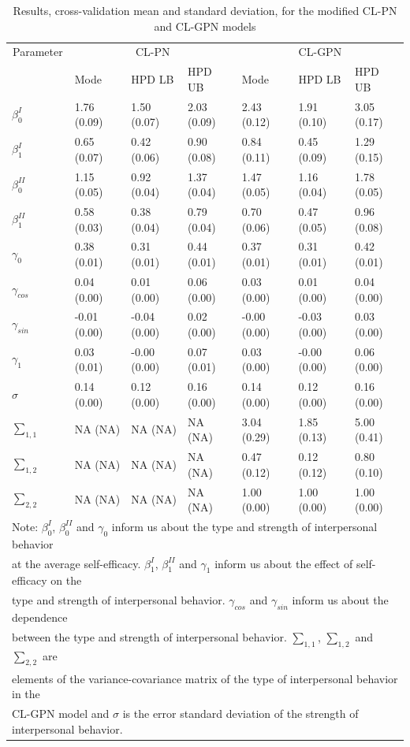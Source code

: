 \documentclass[man,mask]{apa6}
\begin{document}
\begin{table}

\caption{\label{tab:estCLGPN}Results, cross-validation mean and standard deviation, for the modified CL-PN and CL-GPN models}
\centering
\begin{tabular}[t]{lllllll}
\toprule
\multicolumn{1}{c}{Parameter} & \multicolumn{3}{c}{CL-PN} & \multicolumn{3}{c}{CL-GPN} \\
\cmidrule(l{2pt}r{2pt}){1-1} \cmidrule(l{2pt}r{2pt}){2-4} \cmidrule(l{2pt}r{2pt}){5-7}
  & Mode & HPD LB & HPD UB & Mode & HPD LB & HPD UB\\
\midrule
$\beta_0^{I}$ & 1.76 (0.09) & 1.50 (0.07) & 2.03 (0.09) & 2.43 (0.12) & 1.91 (0.10) & 3.05 (0.17)\\
$\beta_1^{I}$ & 0.65 (0.07) & 0.42 (0.06) & 0.90 (0.08) & 0.84 (0.11) & 0.45 (0.09) & 1.29 (0.15)\\
$\beta_0^{II}$ & 1.15 (0.05) & 0.92 (0.04) & 1.37 (0.04) & 1.47 (0.05) & 1.16 (0.04) & 1.78 (0.05)\\
$\beta_1^{II}$ & 0.58 (0.03) & 0.38 (0.04) & 0.79 (0.04) & 0.70 (0.06) & 0.47 (0.05) & 0.96 (0.08)\\
$\gamma_0$ & 0.38 (0.01) & 0.31 (0.01) & 0.44 (0.01) & 0.37 (0.01) & 0.31 (0.01) & 0.42 (0.01)\\
\addlinespace
$\gamma_{cos}$ & 0.04 (0.00) & 0.01 (0.00) & 0.06 (0.00) & 0.03 (0.00) & 0.01 (0.00) & 0.04 (0.00)\\
$\gamma_{sin}$ & -0.01 (0.00) & -0.04 (0.00) & 0.02 (0.00) & -0.00 (0.00) & -0.03 (0.00) & 0.03 (0.00)\\
$\gamma_1$ & 0.03 (0.01) & -0.00 (0.00) & 0.07 (0.01) & 0.03 (0.00) & -0.00 (0.00) & 0.06 (0.00)\\
$\sigma$ & 0.14 (0.00) & 0.12 (0.00) & 0.16 (0.00) & 0.14 (0.00) & 0.12 (0.00) & 0.16 (0.00)\\
$\sum_{1,1}$ & NA (NA) & NA (NA) & NA (NA) & 3.04 (0.29) & 1.85 (0.13) & 5.00 (0.41)\\
\addlinespace
$\sum_{1,2}$ & NA (NA) & NA (NA) & NA (NA) & 0.47 (0.12) & 0.12 (0.12) & 0.80 (0.10)\\
$\sum_{2,2}$ & NA (NA) & NA (NA) & NA (NA) & 1.00 (0.00) & 1.00 (0.00) & 1.00 (0.00)\\
\bottomrule
\multicolumn{7}{l}{Note: $\beta_0^{I}$, $\beta_0^{II}$ and $\gamma_0$ inform us about the type and strength of interpersonal behavior}\\
\multicolumn{7}{l}{at the average self-efficacy. $\beta_1^{I}$, $\beta_1^{II}$ and $\gamma_1$ inform us about the effect of self-efficacy on the}\\
\multicolumn{7}{l}{type and strength of interpersonal behavior. $\gamma_{cos}$ and $\gamma_{sin}$ inform us about the dependence}\\
\multicolumn{7}{l}{ between the type and strength of interpersonal behavior. $\sum_{1,1}$, $\sum_{1,2}$ and $\sum_{2,2}$ are}\\
\multicolumn{7}{l}{elements of the variance-covariance matrix of the type of interpersonal behavior in the}\\
\multicolumn{7}{l}{CL-GPN model and $\sigma$ is the error standard deviation of the strength of interpersonal behavior.}\\


\end{tabular}
\end{table}
\end{document}
